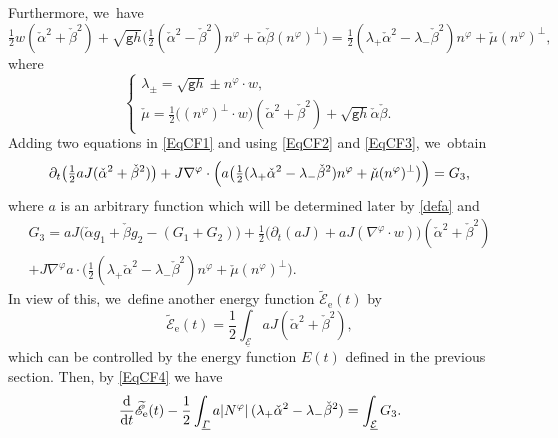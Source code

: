 \documentclass[JEP,XML,SOM,Unicode,NoFloatCountersInSection,published]{cedram}
\newcommand{\gr}{{\mathtt g}}
\newcommand{\dt}{\partial_t}
\newcommand{\cE}{{\mathcal E}}
\newcommand{\ul}[1]{\underline{#1}}
\newcommand{\itGamma}{\mathit{\Gamma}}
\theoremstyle{definition}
\begin{document}
Furthermore, we~have
\begin{equation}\label{EqCF3}
\tfrac12w(\check{\alpha}^2+\check{\beta}^2) + \sqrt{\gr h}\bigl(\tfrac12(\check{\alpha}^2-\check{\beta}^2)n^\varphi + \check{\alpha}\check{\beta}(n^\varphi)^\perp\bigr)
= \tfrac12(\lambda_+\check{\alpha}^2-\lambda_-\check{\beta}^2)n^\varphi + \check{\mu}(n^\varphi)^\perp,
\end{equation}
where
\[
\begin{cases}
\lambda_{\pm} = \sqrt{\gr h}\pm n^\varphi\cdot w, \\
\check{\mu} = \tfrac12\bigl((n^\varphi)^\perp\cdot w\bigr)(\check{\alpha}^2+\check{\beta}^2) + \sqrt{\gr h}\check{\alpha}\check{\beta}.
\end{cases}
\]
Adding two equations in \eqref{EqCF1} and using \eqref{EqCF2} and \eqref{EqCF3}, we~obtain
\begin{equation}\label{EqCF4}
\dt \bigl(\tfrac12aJ(\check{\alpha}^2+\check{\beta}^2) \bigr)
+ J\nabla^\varphi\cdot\Bigl(a \bigl(\tfrac12(\lambda_+\check{\alpha}^2-\lambda_-\check{\beta}^2)n^\varphi + \check{\mu}(n^\varphi)^\perp \bigr) \Bigr) = G_3,
\end{equation}
where $a$ is an arbitrary function which will be determined later by \eqref{defa} and
\begin{multline*}
G_3
= aJ \bigl(\check{\alpha}g_1+\check{\beta}g_2-(G_1+G_2) \bigl) + \tfrac12 \bigl(\dt(aJ)+aJ(\nabla^\varphi\cdot w) \bigr)(\check{\alpha}^2+\check{\beta}^2) \\
+ J\nabla^\varphi a \cdot \bigl(\tfrac12(\lambda_+\check{\alpha}^2-\lambda_-\check{\beta}^2)n^\varphi + \check{\mu}(n^\varphi)^\perp \bigr).
\end{multline*}
In view of this, we~define another energy function $\widetilde{\mathscr{E}}_\mathrm{e}(t)$ by
\begin{equation}\label{defEF2}
\widetilde{\mathscr{E}}_\mathrm{e}(t) = \frac12\int_{\ul{\cE}}aJ(\check{\alpha}^2+\check{\beta}^2),
\end{equation}
which can be controlled by the energy function $E(t)$ defined in the previous section.
Then, by \eqref{EqCF4} we have
\begin{equation}\label{EqCF5}
\frac{\rm d}{{\rm d}t}\widetilde{\mathscr{E}}_\mathrm{e}(t) - \frac12\int_{\ul{\itGamma}} a|N^\varphi|\,(\lambda_+\check{\alpha}^2-\lambda_-\check{\beta}^2)
= \int_{\ul{\cE}}G_3.
\end{equation}
\end{document}
